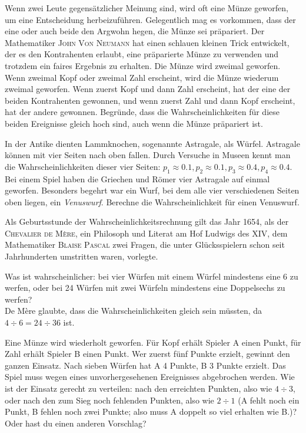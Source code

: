 \documentclass[%
11pt,%
twoside,%
titlepage,%
german,%
headsepline%
]{scrartcl}
\begin{document}
\begin{ueb}
Wenn zwei Leute gegensätzlicher Meinung sind, wird oft eine Münze geworfen, um eine Entscheidung herbeizuführen. Gelegentlich mag es vorkommen, dass der eine oder auch beide den Argwohn hegen, die Münze sei präpariert. Der Mathematiker \textsc{John Von Neumann} hat einen schlauen kleinen Trick entwickelt, der es den Kontrahenten erlaubt, eine präparierte Münze zu verwenden und trotzdem ein faires Ergebnis zu erhalten. Die Münze wird zweimal geworfen. Wenn zweimal Kopf oder zweimal Zahl erscheint, wird die Münze wiederum zweimal geworfen. Wenn zuerst Kopf und dann Zahl erscheint, hat der eine der beiden Kontrahenten gewonnen, und wenn zuerst Zahl und dann Kopf erscheint, hat der andere gewonnen. Begründe, dass die Wahrscheinlichkeiten für diese beiden Ereignisse gleich hoch sind, auch wenn die Münze präpariert ist.
\end{ueb}

\begin{ueb}
 In der Antike dienten Lammknochen, sogenannte Astragale, als Würfel. Astragale können mit vier Seiten nach oben fallen. Durch Versuche in Museen kennt man die Wahrscheinlichkeiten dieser vier Seiten: $p_1\approx0.1, p_2\approx0.1, p_3\approx0.4, p_4\approx0.4$. Bei einem Spiel haben die Griechen und Römer vier Astragale auf einmal geworfen. Besonders begehrt war ein Wurf, bei dem alle vier verschiedenen Seiten oben liegen, ein \emph{Venuswurf}. Berechne die Wahrscheinlichkeit für einen Venuswurf.
 \end{ueb}
 
 \begin{ueb}
Als Geburtsstunde der Wahrscheinlichkeitsrechnung gilt das Jahr 1654, als der \textsc{Chevalier de Mère}, ein Philosoph und Literat am Hof Ludwigs des XIV, dem Mathematiker \textsc{Blaise Pascal} zwei Fragen, die unter Glücksspielern schon seit Jahrhunderten umstritten waren, vorlegte.
\begin{enumeratea}
\item Was ist wahrscheinlicher: bei vier Würfen mit einem Würfel mindestens eine 6 zu werfen, oder bei 24 Würfen mit zwei Würfeln mindestens eine Doppelsechs zu werfen?\\
De Mère glaubte, dass die Wahrscheinlichkeiten gleich sein müssten, da $4\div6 = 24\div36$ ist.
\item Eine Münze wird wiederholt geworfen. Für Kopf erhält Spieler A einen Punkt, für Zahl erhält Spieler B einen Punkt. Wer zuerst fünf Punkte erzielt, gewinnt den ganzen Einsatz. Nach sieben Würfen hat A 4 Punkte, B 3 Punkte erzielt. Das Spiel muss wegen eines unvorhergesehenen Ereignisses abgebrochen werden. Wie ist der Einsatz gerecht zu verteilen: nach den erreichten Punkten, also wie $4\div3$, oder nach den zum Sieg noch fehlenden Punkten, also wie $2\div1$ (A fehlt noch ein Punkt, B fehlen noch zwei Punkte; also muss A doppelt so viel erhalten wie B.)? Oder hast du einen anderen Vorschlag?
\end{enumeratea}
\end{ueb}
\end{document}
